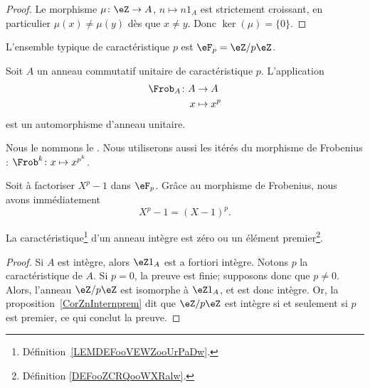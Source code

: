 \begin{proof}
    Le morphisme \( \mu\colon \eZ\to A\), \( n\mapsto n 1_A\) est strictement croissant, en particulier \( \mu(x)\neq \mu(y)\) dès que \( x\neq y\). Donc \( \ker(\mu)=\{ 0 \}\).
\end{proof}

L'ensemble typique de caractéristique \( p\) est \( \eF_p=\eZ/p\eZ\).

\begin{proposition} \label{PropFrobHAMkTY}
    Soit \( A\) un anneau commutatif unitaire de caractéristique \( p\). L'application
    \begin{equation}
        \begin{aligned}
            \Frob_A\colon A&\to A \\
            x&\mapsto x^p
        \end{aligned}
    \end{equation}
    est un automorphisme d'anneau unitaire.
\end{proposition}
Nous le nommons le . Nous utiliserons aussi les itérés du morphisme de Frobenius : \( \Frob^k\colon x\mapsto x^{p^k}\).

\begin{example}
    Soit à factoriser \( X^p-1\) dans \( \eF_p\). Grâce au morphisme de Frobenius, nous avons immédiatement
    \begin{equation}
        X^p-1=(X-1)^p.
    \end{equation}
\end{example}


\begin{lemma}       \label{LemCaractIntergernbrcartpre}
    La caractéristique\footnote{Définition~\ref{LEMDEFooVEWZooUrPaDw}.} d'un anneau intègre est zéro ou un élément premier\footnote{Définition \ref{DEFooZCRQooWXRalw}.}.
\end{lemma}

\begin{proof}
    Si \( A\) est intègre, alors \( \eZ 1_A\) est a fortiori intègre. Notons \( p \) la caractéristique de \( A \). Si \( p = 0 \), la preuve est finie; supposons donc que \( p \neq 0 \). Alors, l'anneau \( \eZ/p\eZ\) est isomorphe à \( \eZ 1_A\), et est donc intègre. Or, la proposition~\ref{CorZnInternprem} dit que \( \eZ/p\eZ\) est intègre si et seulement si \( p\) est premier, ce qui conclut la preuve.
\end{proof}

